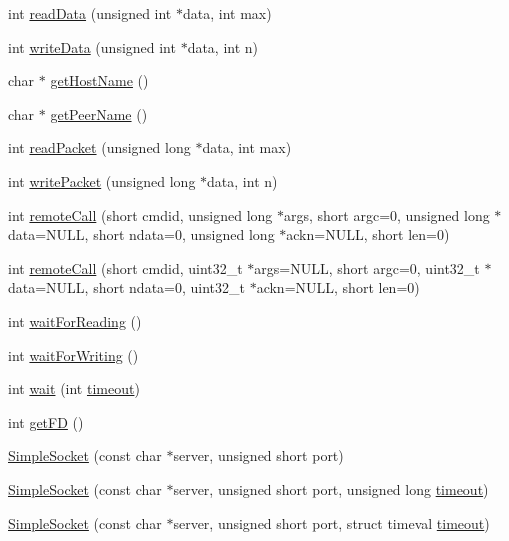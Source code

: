 \begin{DoxyCompactItemize}
int \hyperlink{classSimpleSocket_a9dd04548e098650a982ee8a4f44d080b}{read\-Data} (unsigned int $\ast$data, int max)
\item 
int \hyperlink{classSimpleSocket_aa8ece72de04ca74047b3a0b7f7a20484}{write\-Data} (unsigned int $\ast$data, int n)
\item 
char $\ast$ \hyperlink{classSimpleSocket_aa83abcf775e9638ffb9efe94472e841e}{get\-Host\-Name} ()
\item 
char $\ast$ \hyperlink{classSimpleSocket_ab04083cd52eb47f220a5a08d52b23ae5}{get\-Peer\-Name} ()
\item 
int \hyperlink{classSimpleSocket_af1de8044e016d3e6f0baf14a7130515f}{read\-Packet} (unsigned long $\ast$data, int max)
\item 
int \hyperlink{classSimpleSocket_a4c0227fb99f56767449617d88f1912bc}{write\-Packet} (unsigned long $\ast$data, int n)
\item 
int \hyperlink{classSimpleSocket_a861ec1830251182b7581c9db0a012c97}{remote\-Call} (short cmdid, unsigned long $\ast$args, short argc=0, unsigned long $\ast$data=N\-U\-L\-L, short ndata=0, unsigned long $\ast$ackn=N\-U\-L\-L, short len=0)
\item 
int \hyperlink{classSimpleSocket_aa707339f5e3cad2c475e9abbbea00328}{remote\-Call} (short cmdid, uint32\-\_\-t $\ast$args=N\-U\-L\-L, short argc=0, uint32\-\_\-t $\ast$data=N\-U\-L\-L, short ndata=0, uint32\-\_\-t $\ast$ackn=N\-U\-L\-L, short len=0)
\item 
int \hyperlink{classSimpleSocket_af9db6aa7c5c95cd00593cd73634a6adc}{wait\-For\-Reading} ()
\item 
int \hyperlink{classSimpleSocket_a27211c208598898ac3fcd9dd4b8dcd78}{wait\-For\-Writing} ()
\item 
int \hyperlink{classSimpleSocket_aa140f9d5c79130bd98da84a61cc2b285}{wait} (int \hyperlink{classSimpleSocket_ac2e777bd36689f4f136b9c5b9e9c5f0e}{timeout})
\item 
int \hyperlink{classSimpleSocket_abfe8170623b9a86f384433c37bae362d}{get\-F\-D} ()
\item 
\hyperlink{classSimpleSocket_ab743c534336f17d61023a808ec348877}{Simple\-Socket} (const char $\ast$server, unsigned short port)
\item 
\hyperlink{classSimpleSocket_aaaa3efe38c1c210643acd071115a8565}{Simple\-Socket} (const char $\ast$server, unsigned short port, unsigned long \hyperlink{classSimpleSocket_ac2e777bd36689f4f136b9c5b9e9c5f0e}{timeout})
\item 
\hyperlink{classSimpleSocket_a273bb8620aa05f75029f39e069e18e4f}{Simple\-Socket} (const char $\ast$server, unsigned short port, struct timeval \hyperlink{classSimpleSocket_ac2e777bd36689f4f136b9c5b9e9c5f0e}{timeout})

\end{DoxyCompactItemize}

